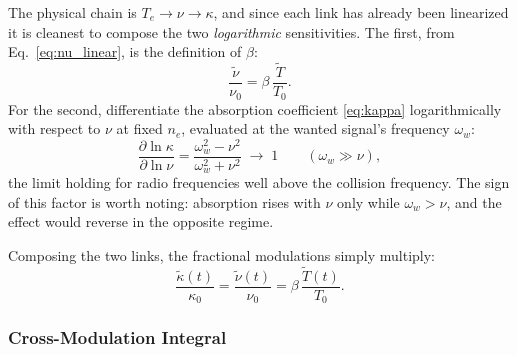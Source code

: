 \documentclass[12pt]{article}
\begin{document}
The physical chain is $T_e \to \nu \to \kappa$, and since each link has already been
linearized it is cleanest to compose the two \emph{logarithmic} sensitivities.  The first,
from Eq.~\eqref{eq:nu_linear}, is the definition of $\beta$:
\begin{equation}
  \frac{\widetilde{\nu}}{\nu_0} = \beta\,\frac{\widetilde{T}}{T_0}.
  \label{eq:nu_osc}
\end{equation}
For the second, differentiate the absorption coefficient \eqref{eq:kappa} logarithmically
with respect to $\nu$ at fixed $n_e$, evaluated at the wanted signal's frequency
$\omega_w$:
\begin{equation}
  \frac{\partial\ln\kappa}{\partial\ln\nu}
    = \frac{\omega_w^2 - \nu^2}{\omega_w^2 + \nu^2}
    \;\longrightarrow\; 1
  \qquad (\omega_w \gg \nu),
  \label{eq:dkappa_dnu}
\end{equation}
the limit holding for radio frequencies well above the collision frequency.  The sign of
this factor is worth noting: absorption rises with $\nu$ only while $\omega_w > \nu$, and
the effect would reverse in the opposite regime.

Composing the two links, the fractional modulations simply multiply:
\begin{equation}
  \frac{\widetilde{\kappa}(t)}{\kappa_0}
    = \frac{\widetilde{\nu}(t)}{\nu_0}
    = \beta\,\frac{\widetilde{T}(t)}{T_0}.
  \label{eq:kappa_osc}
\end{equation}

\subsubsection{Cross-Modulation Integral}
\end{document}
